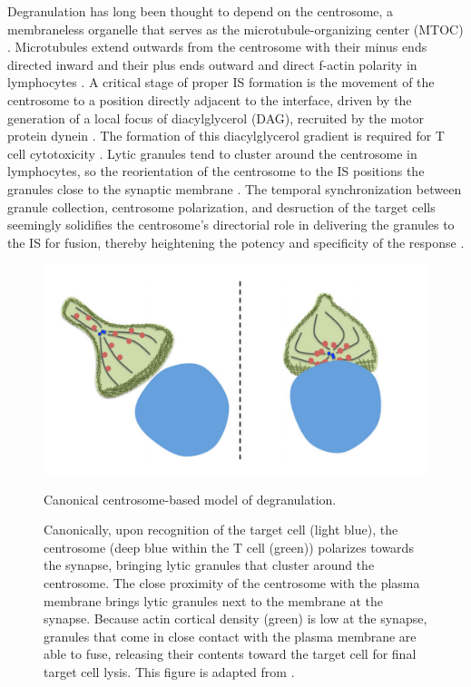 Degranulation has long been thought to depend on the centrosome, a membraneless organelle that serves as the microtubule-organizing center (MTOC)  \cite{Bettencourt-Dias2007, Pihan2013}. Microtubules extend outwards from the centrosome with their minus ends directed inward and their plus ends outward and direct f-actin polarity in lymphocytes \cite{Pineau2022}. A critical stage of proper IS formation is the movement of the centrosome to a position directly adjacent to the interface, driven by the generation of a local focus of diacylglycerol (DAG), recruited by the motor protein dynein \cite{Quann2009}. The formation of this diacylglycerol gradient is required for T cell cytotoxicity \cite{Quann2009}. Lytic granules tend to cluster around the centrosome in lymphocytes, so the reorientation of the centrosome to the IS positions the granules close to the synaptic membrane \cite{Stinchcombe2007}. The temporal synchronization between granule collection, centrosome polarization,  and desruction of the target cells seemingly solidifies the centrosome's directorial role in delivering the granules to the IS for fusion, thereby heightening the potency and specificity of the response \cite{Stinchcombe2007}. 

\begin{figure}[htbp]
	\centering
	\includegraphics[width=0.8\columnwidth]{../figures/chapter3/centrosome.png}
	\caption{Canonical centrosome-based model of degranulation.}
	\caption*{Canonically, upon recognition of the target cell (light blue), the centrosome (deep blue within the T cell (green)) polarizes towards the synapse, bringing  lytic granules that cluster around the centrosome. The close proximity of the centrosome with the plasma membrane brings lytic granules next to the membrane at the synapse. Because actin cortical density (green) is low at the synapse, granules that come in close contact with the plasma membrane are able to fuse, releasing their contents toward the target cell for final target cell lysis. This figure is adapted from \cite{Ritter2013}.}
	\label{fig:centrosome}
\end{figure}

